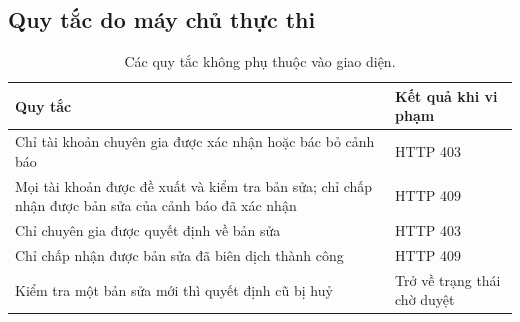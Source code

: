 \documentclass[12pt,a4paper]{article}
\begin{document}
\subsection{Quy tắc do máy chủ thực thi}
\begin{table}[H]\centering\small
\caption{Các quy tắc không phụ thuộc vào giao diện.}\label{tab:rules}
\begin{tabularx}{\textwidth}{Yl}
\toprule
Quy tắc & Kết quả khi vi phạm\\
\midrule
Chỉ tài khoản chuyên gia được xác nhận hoặc bác bỏ cảnh báo & HTTP 403\\
Mọi tài khoản được đề xuất và kiểm tra bản sửa; chỉ chấp nhận được bản sửa của cảnh báo đã xác nhận & HTTP 409\\
Chỉ chuyên gia được quyết định về bản sửa & HTTP 403\\
Chỉ chấp nhận được bản sửa đã biên dịch thành công & HTTP 409\\
Kiểm tra một bản sửa mới thì quyết định cũ bị huỷ & Trở về trạng thái chờ duyệt\\
\bottomrule
\end{tabularx}
\end{table}
\end{document}
